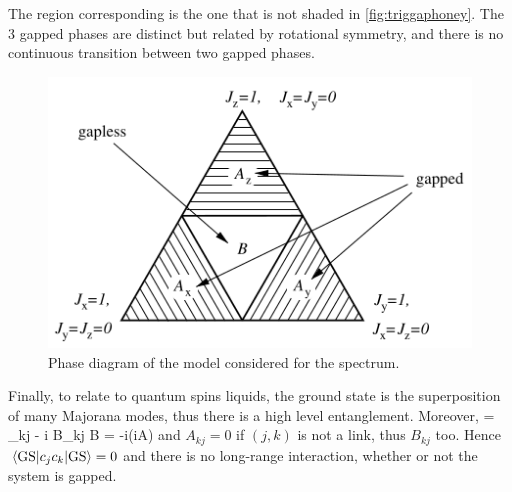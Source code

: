 		The region corresponding is the one that is not shaded in \autoref{fig:triggaphoney}. The 3 gapped phases are distinct but related by rotational symmetry, and there is no continuous transition between two gapped phases.

		\begin{figure}[h!]
            \centering
            \includegraphics[scale=0.6]{graphs/triggaphoney.png}
            \caption{Phase diagram of the model considered for the spectrum.}
            \label{fig:triggaphoney}
        \end{figure}

		Finally, to relate to quantum spins liquids, the ground state is the superposition of many Majorana modes, thus there is a high level entanglement. Moreover,
		\be {} = \delta_{kj} - i B_{kj}  B = -i(iA) \ee
		and $A_{kj} = 0$ if $(j,k)$ is not a link, thus $B_{kj}$ too. Hence $\ev{c_j c_k}{\text{GS}} =0$ and there is no long-range interaction, whether or not the system is gapped.

 